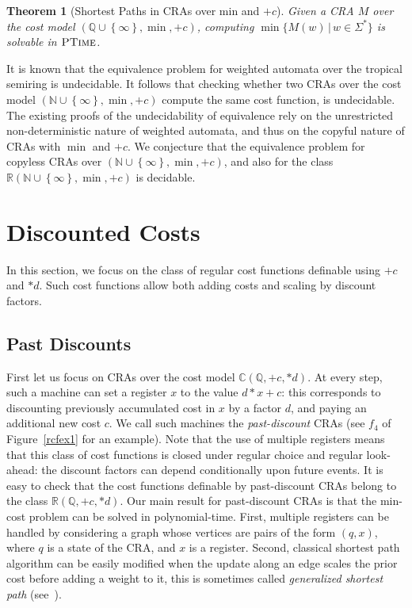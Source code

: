 \documentclass[11pt]{article}
\newtheorem{theorem}{Theorem}
\newcommand{\mypar}[1]{\subsection{#1}}
\newcommand{\Nat}{\ensuremath{\mathbb{N}}}
\newcommand{\Rat}{\ensuremath{\mathbb{Q}}}
\newcommand{\sep}{\ensuremath{\,|\,}}
\newcommand{\reg}[1]{{\mathbb R}(#1)}
\newcommand{\CostModel}{\ensuremath{\mathbb{C}}}
\newcommand{\fm}[1]{\ensuremath{#1^{*}}}
\newcommand{\ptime}{\ensuremath{\sc\textsc{PTime}}\xspace}
\newcommand{\edwa}{\ensuremath{M}}
\begin{document}
\begin{theorem}[Shortest Paths in CRAs over min and $+c$]
Given a CRA $\edwa$ over the cost model $(\Rat\cup \left\{\infty\right\},\min,+c)$, computing $\min\{\edwa(w)\sep w\in\fm\Sigma\}$
is solvable in $\ptime$.
\end{theorem}

It is known that the equivalence problem for weighted automata over the tropical semiring
is undecidable.
It follows that checking whether two CRAs over the cost model $(\Nat\cup \left\{\infty\right\},\min,+c)$ compute the same cost function,
is undecidable.
The existing proofs of the undecidability of equivalence rely
on the unrestricted non-deterministic nature of weighted automata, and thus on
the copyful nature of CRAs with $\min$ and $+c$.
We conjecture that the equivalence problem for copyless CRAs over $(\Nat\cup \left\{\infty\right\},\min,+c)$,
and also for the class $\reg{\Nat\cup \left\{\infty\right\},\min,+c}$ is decidable.


\section{Discounted Costs}\label{sec:disc}
In this section, we focus on the class of regular cost functions
definable using $+c$ and $*d$. Such cost functions allow both adding
costs and scaling by discount factors.

\mypar{Past Discounts} First let us focus on CRAs over the cost
model $\CostModel\left(\Rat, +c, *d\right)$. At every step, such a
machine can set a register $x$ to the value $d*x + c$: this
corresponds to discounting previously accumulated cost in $x$ by a
factor $d$, and paying an additional new cost $c$. We call such
machines the {\em past-discount} CRAs (see $f_4$ of
Figure~\ref{rcfex1} for an example). Note that the use of multiple
registers means that this class of cost functions is closed under
regular choice and regular look-ahead: the discount factors can
depend conditionally upon future events. It is easy to check that
the cost functions definable by past-discount CRAs belong to the
class $\reg{\Rat,+c,*d}$. Our main result for past-discount CRAs is
that the min-cost problem can be solved in polynomial-time. First,
multiple registers can be handled by considering a graph whose
vertices are pairs of the form $(q,x)$, where $q$ is a state of the
CRA, and $x$ is a register. Second, classical shortest path
algorithm can be easily modified when the update along an edge
scales the prior cost before adding a weight to it, this is
sometimes called {\em generalized shortest path\/}
(see~\cite{batagelj_generalized_2000,oldham_combinatorial_1999}).
\end{document}
